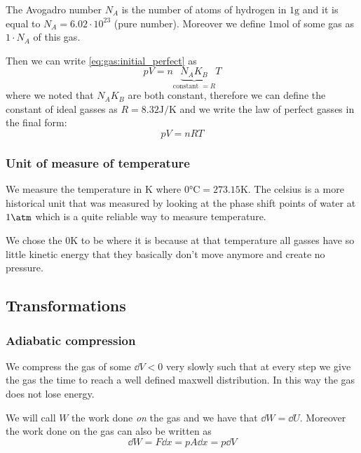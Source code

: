 \documentclass[14pt]{extarticle}
\begin{document}
The Avogadro number $N_A$ is the number of atoms of hydrogen in $1 \si{\gram}$ and it is equal to $N_A = 6.02 \cdot 10^{23}$ (pure number).
Moreover we define $1 \si{\mole}$ of some gas as $1 \cdot N_A$ of this gas.

Then we can write \autoref{eq:gas:initial_perfect} as
\begin{equation}
    pV = n \underbrace{N_A K_B}_{\text{constant } = R} T
\end{equation}
where we noted that $N_A K_B$ are both constant, therefore we can define the constant of ideal gasses as $R = 8.32 \si{\joule \per \kelvin}$ and we write the law of perfect gasses in the final form:
\begin{equation}
    \label{eq:gas:perfect}
    pV = nRT
\end{equation}

\subsubsection{Unit of measure of temperature}

We measure the temperature in $\si{\kelvin}$ where $0 \si{\celsius} = 273.15 \si{\kelvin}$.
The celsius is a more historical unit that was measured by looking at the phase shift points of water at $1 \si{\atm}$ which is a quite reliable way to measure temperature.

We chose the $0 \si{\kelvin}$ to be where it is because at that temperature all gasses have so little kinetic energy that they basically don't move anymore and create no pressure.

\subsection{Transformations}

\subsubsection{Adiabatic compression}

We compress the gas of some $\dd{V} < 0$ very slowly such that at every step we give the gas the time to reach a well defined maxwell distribution.
In this way the gas does not lose energy.

We will call $W$ the work done \emph{on} the gas and we have that $\dd{W} = \dd{U}$.
Moreover the work done on the gas can also be written as
\begin{equation}
    \dd{W} = F \dd{x} = p A \dd{x} = p \dd{V}
\end{equation}
\end{document}
